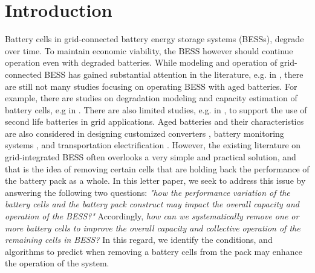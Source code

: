 \documentclass[10pt,twocolumn]{IEEEtran}
\begin{document}


\section{Introduction}

%
%
%
Battery cells  in grid-connected battery energy storage systems (BESSs), degrade  over time.
To maintain economic viability, the BESS however should continue operation even with  degraded batteries.
While  modeling and operation  of grid-connected BESS has gained substantial attention in the literature, e.g. in \cite{8663451, 8003332}, there are still not  many studies focusing on operating BESS with  aged batteries.  
For example,  there are  studies on degradation modeling and capacity estimation of battery cells, e.g in \cite{rong2006analytical,  roscher2011detection, martinez2016evaluation, goebel2008prognostics}.
There are also limited studies, e.g. in \cite{saez2015second, keeli2012optimal},  to support the use of second life batteries in grid applications. 
%	
Aged batteries and their characteristics are also considered in designing customized converters \cite{6861989}, battery monitoring systems  \cite{tong2017demonstration}, and transportation electrification \cite{liao2017performance}.
However, the existing literature on grid-integrated BESS often overlooks a very simple and practical solution, and that is the idea of removing certain cells that are holding back the performance of the battery pack as a whole. 
In this letter paper, we seek to address this issue by answering the following two questions: 
\emph{"how the performance variation of the battery cells and the battery pack construct may impact the overall capacity and operation of the BESS?"} 
 Accordingly, \emph{how can we systematically remove one or more battery cells to improve the overall capacity and collective operation of the remaining cells in BESS?} 
In this regard, we identify the conditions, and algorithms to predict when removing a battery cells from the pack may enhance the operation of the system.  
\end{document}
